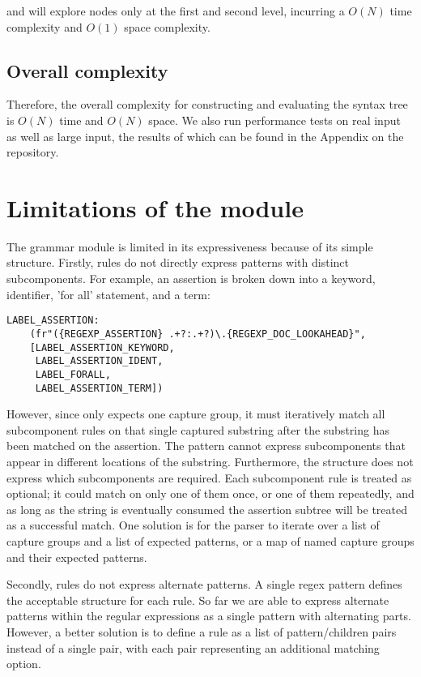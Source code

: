  and  will explore nodes only at the first and second level, incurring a $ O(N) $ time complexity and  $ O(1) $ space complexity.

\subsection{Overall complexity}
Therefore, the overall complexity for constructing and evaluating the syntax tree is $ O(N) $ time and $ O(N) $ space. We also run performance tests on real input as well as large input, the results of which can be found in the Appendix on the repository.

\section{Limitations of the  module}
\label{limitations-grammar}
The grammar module is limited in its expressiveness because of its simple structure. Firstly, rules do not directly express patterns with distinct subcomponents. For example, an assertion is broken down into a keyword, identifier, 'for all' statement, and a term:

\begin{verbatim}
LABEL_ASSERTION: 
    (fr"({REGEXP_ASSERTION} .+?:.+?)\.{REGEXP_DOC_LOOKAHEAD}",
    [LABEL_ASSERTION_KEYWORD,
     LABEL_ASSERTION_IDENT,
     LABEL_FORALL,
     LABEL_ASSERTION_TERM])
\end{verbatim}

However, since  only expects one capture group, it must iteratively match all subcomponent rules on that single captured substring after the substring has been matched on the assertion. The pattern cannot express subcomponents that appear in different locations of the substring. Furthermore, the structure does not express which subcomponents are required. Each subcomponent rule is treated as optional; it could match on only one of them once, or one of them repeatedly, and as long as the string is eventually consumed the assertion subtree will be treated as a successful match. One solution is for the parser to iterate over a list of capture groups and a list of expected patterns, or a map of named capture groups and their expected patterns.

Secondly, rules do not express alternate patterns. A single regex pattern defines the acceptable structure for each rule. So far we are able to express alternate patterns within the regular expressions as a single pattern with alternating parts. However, a better solution is to define a rule as a list of pattern/children pairs instead of a single pair, with each pair representing an additional matching option.

